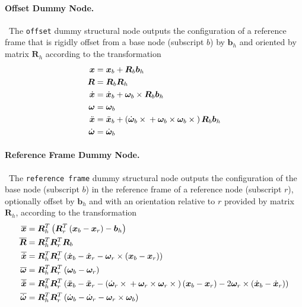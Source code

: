 \documentclass[10pt,dvips,fleqn,subeqn]{report}
\newcommand{\T}[1]{\bm{#1}}
\begin{document}
\paragraph{Offset Dummy Node.} \
The \texttt{offset} dummy structural node outputs the configuration
of a reference frame that is rigidly offset from a base node
(subscript $b$) by $\T{b}_h$ and oriented by matrix $\T{R}_h$ according 
to the transformation
\begin{subequations}
\begin{align}
	\T{x} &= \T{x}_b + \T{R}_b \T{b}_h \\
	\T{R} &= \T{R}_b \T{R}_h \\
	\dot{\T{x}} &= \dot{\T{x}}_b + \T{\omega}_b \times \T{R}_b \T{b}_h \\
	\T{\omega} &= \T{\omega}_b \\
	\ddot{\T{x}} &= \ddot{\T{x}}_b + \plbr{
		\dot{\T{\omega}}_b \times{}
		+ \T{\omega}_b \times \T{\omega}_b \times{}
	} \T{R}_b \T{b}_h \\
	\dot{\T{\omega}} &= \dot{\T{\omega}}_b
\end{align}
\end{subequations}


\paragraph{Reference Frame Dummy Node.} \
The \texttt{reference frame} dummy structural node
outputs the configuration of the base node (subscript $b$)
in the reference frame of a reference node (subscript $r$),
optionally offset by $\T{b}_h$ and with an orientation relative 
to $r$ provided by matrix $\T{R}_h$,
according to the transformation
\begin{subequations}
\begin{align}
	\overline{\T{x}} &= \T{R}_h^T \plbr{\T{R}_r^T \plbr{\T{x}_b - \T{x}_r} - \T{b}_h}\\
	\overline{\T{R}} &= \T{R}_h^T \T{R}_r^T \T{R}_b \\
	\overline{\dot{\T{x}}} &= \T{R}_h^T \T{R}_r^T \plbr{
		\dot{\T{x}}_b
		- \dot{\T{x}}_r
		- \T{\omega}_r\times\plbr{\T{x}_b - \T{x}_r}
	} \\
	\overline{\T{\omega}} &= \T{R}_h^T \T{R}_r^T \plbr{\T{\omega}_b - \T{\omega}_r} \\
	\overline{\ddot{\T{x}}} &= \T{R}_h^T \T{R}_r^T \plbr{
		\ddot{\T{x}}_b
		- \ddot{\T{x}}_r
		- \plbr{
			\dot{\T{\omega}}_r \times{}
			+ \T{\omega}_r \times \T{\omega}_r \times{}
		} \plbr{\T{x}_b - \T{x}_r}
		- 2 \T{\omega}_r \times \plbr{\dot{\T{x}}_b - \dot{\T{x}}_r}
	} \\
	\overline{\dot{\T{\omega}}} &= \T{R}_h^T \T{R}_r^T \plbr{
		\dot{\T{\omega}}_b
		- \dot{\T{\omega}}_r
		- \T{\omega}_r \times \T{\omega}_b
	}
\end{align}
\end{subequations}
\end{document}
